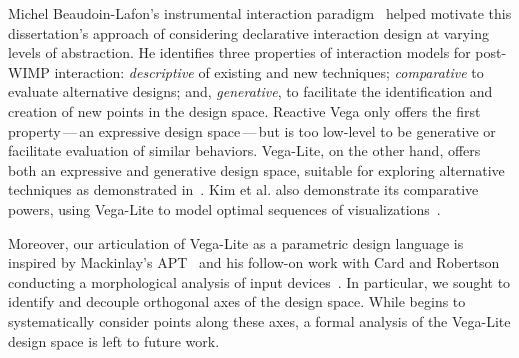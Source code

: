 Michel Beaudoin-Lafon's instrumental interaction
paradigm~\cite{beaudouin:instrumental} helped motivate this dissertation's
approach of considering declarative interaction design at varying levels of
abstraction. He identifies three properties of interaction models for post-WIMP
interaction: \emph{descriptive} of existing and new techniques;
\emph{comparative} to evaluate alternative designs; and, \emph{generative}, to
facilitate the identification and creation of new points in the design space.
Reactive Vega only offers the first property\,---\,an expressive design
space\,---\,but is too low-level to be generative or facilitate evaluation of
similar behaviors. Vega-Lite, on the other hand, offers both an expressive and
generative design space, suitable for exploring alternative techniques as
demonstrated in~. Kim et al. also demonstrate its
comparative powers, using Vega-Lite to model optimal sequences of
visualizations~\cite{kim:graphscape}.

Moreover, our articulation of Vega-Lite as a parametric design language is
inspired by Mackinlay's APT~\cite{mackinlay:apt} and his follow-on work with
Card and Robertson conducting a morphological analysis of input
devices~\cite{card:morphological}. In particular, we sought to identify and
decouple orthogonal axes of the design space. While 
begins to systematically consider points along these axes, a formal analysis of
the Vega-Lite design space is left to future work.